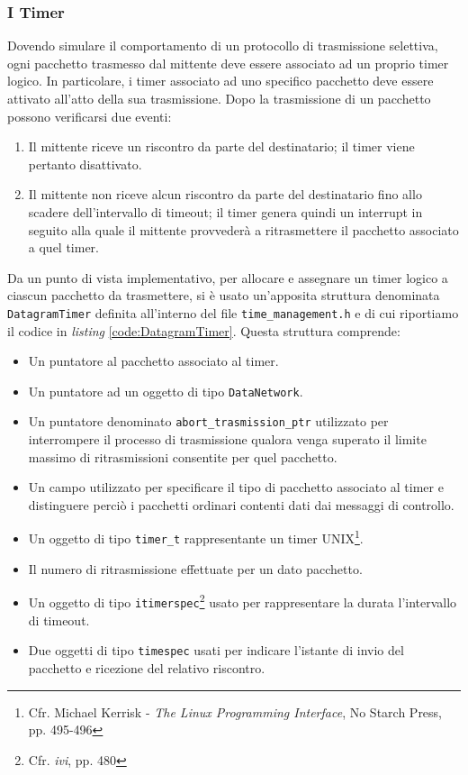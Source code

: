 \documentclass[10pt,a4paper, titlepage]{report}
\begin{document}
\subsubsection{I Timer}

Dovendo simulare il comportamento di un protocollo di trasmissione selettiva, ogni pacchetto trasmesso dal mittente deve essere associato ad un proprio timer logico. In particolare, i timer associato ad uno specifico pacchetto deve essere attivato all'atto della sua trasmissione. Dopo la trasmissione di un pacchetto possono verificarsi due eventi:

\begin{enumerate}
\item Il mittente riceve un riscontro da parte del destinatario; il timer viene pertanto disattivato. 
\item Il mittente non riceve alcun riscontro da parte del destinatario fino allo scadere dell'intervallo di timeout; il timer genera quindi un interrupt in seguito alla quale il mittente provvederà a ritrasmettere il pacchetto associato a quel timer.
\end{enumerate}

Da un punto di vista implementativo, per allocare e assegnare un timer logico a ciascun pacchetto da trasmettere, si è usato un'apposita struttura denominata \texttt{DatagramTimer} definita all'interno del file \texttt{time\_management.h} e di cui riportiamo il codice in \textit{listing} \ref{code:DatagramTimer}. Questa struttura comprende:

\begin{itemize}
\item Un puntatore al pacchetto associato al timer.
\item Un puntatore ad un oggetto di tipo \texttt{DataNetwork}.
\item Un puntatore denominato \texttt{abort\_trasmission\_ptr} utilizzato per interrompere il processo di trasmissione qualora venga superato il limite massimo di ritrasmissioni consentite per quel pacchetto.
\item Un campo utilizzato per specificare il tipo di pacchetto associato al timer e distinguere perciò i pacchetti ordinari contenti dati dai messaggi di controllo.
\item Un oggetto di tipo \texttt{timer\_t} rappresentante un timer UNIX\footnote{Cfr. Michael Kerrisk - \textit{The Linux Programming Interface}, No Starch Press, pp. 495-496}.
\item Il numero di ritrasmissione effettuate per un dato pacchetto.
\item Un oggetto di tipo \texttt{itimerspec}\footnote{Cfr. \textit{ivi}, pp. 480} usato per rappresentare la durata l'intervallo di timeout.
\item Due oggetti di tipo \texttt{timespec} usati per indicare l'istante di invio del pacchetto e ricezione del relativo riscontro.
\end{itemize}
\end{document}
